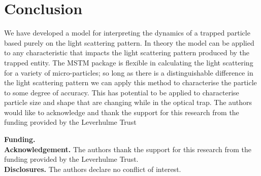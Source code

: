 \documentclass[final, 3p]{elsarticle}
\begin{document}
\section{Conclusion}
\label{4}
We have developed a model for interpreting the dynamics of a trapped particle based purely on the light scattering pattern. In theory the model can be applied to any characteristic that impacts the light scattering pattern produced by the trapped entity. The MSTM package is flexible in calculating the light scattering for a variety of micro-particles; so long as there is a distinguishable difference in the light scattering pattern we can apply this method to characterise the particle to some degree of accuracy. This has potential to be applied to characterise particle size and shape that are changing while in the optical trap. The authors would like to acknowledge and thank the support for this research from the funding provided by the Leverhulme Trust

\noindent \textbf{Funding.} \\

\noindent \textbf{Acknowledgement.} The authors thank the support for this research from the funding provided by the Leverhulme Trust. \\
  
\noindent \textbf{Disclosures.} The authors declare no conflict of interest. \\


 


\newpage
\appendix
\onecolumn
\end{document}
